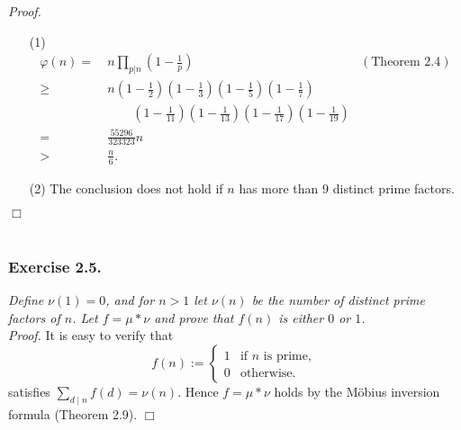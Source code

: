 \documentclass{article}
\begin{document}
\emph{Proof.}
\begin{enumerate}
\item[(1)]
  \begin{align*}
    \varphi(n)
    = &\:
    n \prod_{p|n}\left( 1 - \frac{1}{p} \right)
      &(\text{Theorem 2.4}) \\
    \geq &\:
    n \left( 1 - \frac{1}{2} \right) \left( 1 - \frac{1}{3} \right)
      \left( 1 - \frac{1}{5} \right) \left( 1 - \frac{1}{7} \right) \\
    & \: \qquad
      \left( 1 - \frac{1}{11} \right) \left( 1 - \frac{1}{13} \right)
      \left( 1 - \frac{1}{17} \right) \left( 1 - \frac{1}{19} \right) \\
    = &\: \frac{55296}{323323} n \\
    > &\: \frac{n}{6}.
  \end{align*}

\item[(2)]
  The conclusion does not hold if $n$ has more than $9$ distinct prime factors.
\end{enumerate}
$\Box$ \\\\






\subsubsection*{Exercise 2.5.}
\emph{Define $\nu(1) = 0$,
and for $n > 1$ let $\nu(n)$ be the number of distinct prime factors of $n$.
Let $f = \mu * \nu$ and prove that $f(n)$ is either $0$ or $1$.} \\



\emph{Proof.}
  It is easy to verify that
  \begin{equation*}
    f(n) :=
    \begin{cases}
      1 & \text{if $n$ is prime}, \\
      0 & \text{otherwise}.
    \end{cases}
  \end{equation*}
  satisfies $\sum_{d \mid n} f(d) = \nu(n)$.
  Hence $f = \mu * \nu$ holds by the M\"obius inversion formula (Theorem 2.9).
$\Box$ \\
\end{document}

